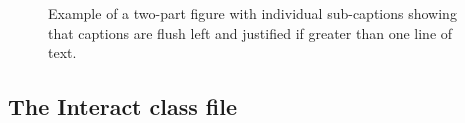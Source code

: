 \documentclass[]{interact}
\theoremstyle{plain}%
\theoremstyle{definition}
\theoremstyle{remark}
\begin{document}
\begin{figure}
\centering
{}\hspace{5pt}
\caption{Example of a two-part figure with individual sub-captions
 showing that captions are flush left and justified if greater
 than one line of text.} \label{sample-figure}
\end{figure}

\hypertarget{the-class-file}{%
\subsection{\texorpdfstring{The \textsf{Interact} class file}{The  class file}}\label{the-class-file}}
\end{document}
